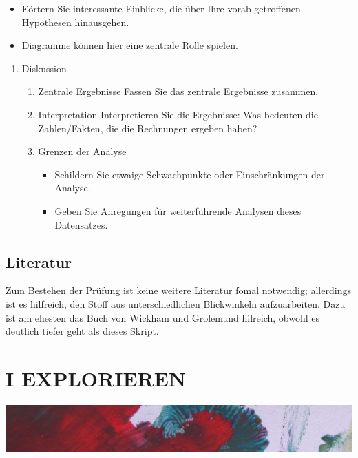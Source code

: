 \documentclass[12pt,ngerman,]{book}
\providecommand{\tightlist}{%
  \setlength{\itemsep}{0pt}\setlength{\parskip}{0pt}}
\begin{document}
\begin{itemize}
\tightlist
\item
  Eörtern Sie interessante Einblicke, die über Ihre vorab getroffenen
  Hypothesen hinausgehen.
\item
  Diagramme können hier eine zentrale Rolle spielen.
\end{itemize}

\begin{enumerate}
\def\labelenumi{\arabic{enumi}.}
\setcounter{enumi}{3}
\item
  Diskussion

  \begin{enumerate}
  \def\labelenumii{\arabic{enumii}.}
  \item
    Zentrale Ergebnisse Fassen Sie das zentrale Ergebnisse zusammen.
  \item
    Interpretation Interpretieren Sie die Ergebnisse: Was bedeuten die
    Zahlen/Fakten, die die Rechnungen ergeben haben?
  \item
    Grenzen der Analyse

    \begin{itemize}
    \tightlist
    \item
      Schildern Sie etwaige Schwachpunkte oder Einschränkungen der
      Analyse.
    \item
      Geben Sie Anregungen für weiterführende Analysen dieses
      Datensatzes.
    \end{itemize}
  \end{enumerate}
\end{enumerate}

\section{Literatur}\label{literatur}

Zum Bestehen der Prüfung ist keine weitere Literatur fomal notwendig;
allerdings ist es hilfreich, den Stoff aus unterschiedlichen
Blickwinkeln aufzuarbeiten. Dazu ist am ehesten das Buch von Wickham und
Grolemund \citep{r4ds} hilreich, obwohl es deutlich tiefer geht als
dieses Skript.

\chapter*{I EXPLORIEREN}\label{i-explorieren}

\begin{center}\includegraphics[width=1\linewidth]{images/farb1} \end{center}
\end{document}
